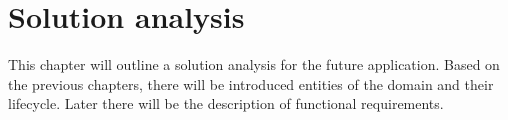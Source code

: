 
\chapter{Solution analysis}\label{ch:solution-analysis}

This chapter will outline a solution analysis for the future application.
Based on the previous chapters, there will be introduced entities of the domain and their lifecycle.
Later there will be the description of functional requirements.












